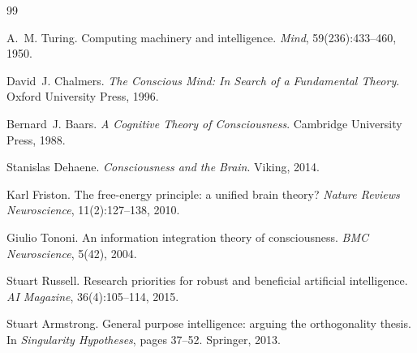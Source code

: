 \documentclass[11pt]{article}
\newcommand{\1}{\mathbf{1}}
\begin{document}
\begin{thebibliography}{99}

A.~M. Turing.
\newblock Computing machinery and intelligence.
\newblock \emph{Mind}, 59(236):433--460, 1950.

David~J. Chalmers.
\newblock \emph{The Conscious Mind: In Search of a Fundamental Theory}.
\newblock Oxford University Press, 1996.

Bernard~J. Baars.
\newblock \emph{A Cognitive Theory of Consciousness}.
\newblock Cambridge University Press, 1988.

Stanislas Dehaene.
\newblock \emph{Consciousness and the Brain}.
\newblock Viking, 2014.

Karl Friston.
\newblock The free-energy principle: a unified brain theory?
\newblock \emph{Nature Reviews Neuroscience}, 11(2):127--138, 2010.

Giulio Tononi.
\newblock An information integration theory of consciousness.
\newblock \emph{BMC Neuroscience}, 5(42), 2004.

Stuart Russell.
\newblock Research priorities for robust and beneficial artificial intelligence.
\newblock \emph{AI Magazine}, 36(4):105--114, 2015.

Stuart Armstrong.
\newblock General purpose intelligence: arguing the orthogonality thesis.
\newblock In \emph{Singularity Hypotheses}, pages 37--52. Springer, 2013.

\end{thebibliography}
\end{document}
